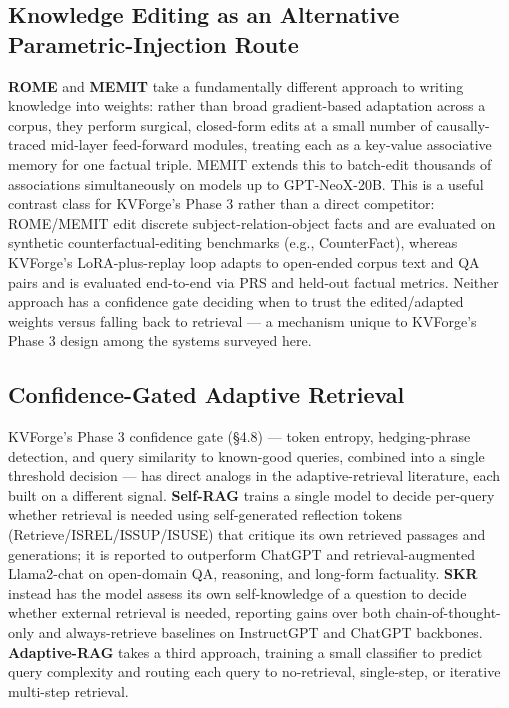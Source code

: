 \documentclass[10pt,twocolumn]{article}
\begin{document}
\subsection{Knowledge Editing as an Alternative Parametric-Injection Route}

\textbf{ROME} \cite{ref28} and \textbf{MEMIT} \cite{ref29} take a fundamentally different approach to writing knowledge into weights: rather than broad gradient-based adaptation across a corpus, they perform surgical, closed-form edits at a small number of causally-traced mid-layer feed-forward modules, treating each as a key-value associative memory for one factual triple. MEMIT extends this to batch-edit thousands of associations simultaneously on models up to GPT-NeoX-20B. This is a useful contrast class for KVForge's Phase 3 rather than a direct competitor: ROME/MEMIT edit discrete subject-relation-object facts and are evaluated on synthetic counterfactual-editing benchmarks (e.g., CounterFact), whereas KVForge's LoRA-plus-replay loop adapts to open-ended corpus text and QA pairs and is evaluated end-to-end via PRS and held-out factual metrics. Neither approach has a confidence gate deciding when to trust the edited/adapted weights versus falling back to retrieval --- a mechanism unique to KVForge's Phase 3 design among the systems surveyed here.


\subsection{Confidence-Gated Adaptive Retrieval}

KVForge's Phase 3 confidence gate (\S{}4.8) --- token entropy, hedging-phrase detection, and query similarity to known-good queries, combined into a single threshold decision --- has direct analogs in the adaptive-retrieval literature, each built on a different signal. \textbf{Self-RAG} \cite{ref30} trains a single model to decide per-query whether retrieval is needed using self-generated reflection tokens (Retrieve/ISREL/ISSUP/ISUSE) that critique its own retrieved passages and generations; it is reported to outperform ChatGPT and retrieval-augmented Llama2-chat on open-domain QA, reasoning, and long-form factuality. \textbf{SKR} \cite{ref31} instead has the model assess its own self-knowledge of a question to decide whether external retrieval is needed, reporting gains over both chain-of-thought-only and always-retrieve baselines on InstructGPT and ChatGPT backbones. \textbf{Adaptive-RAG} \cite{ref32} takes a third approach, training a small classifier to predict query complexity and routing each query to no-retrieval, single-step, or iterative multi-step retrieval.
\end{document}
